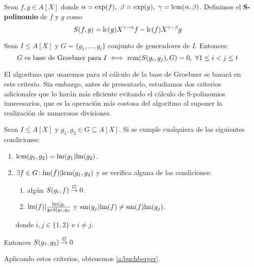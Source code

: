 \begin{definicion}
    Sean $f,g \in A[X]$ donde $\alpha=\exp(f),\ \beta=\exp(g),\ \gamma = \text{lcm}(\alpha,\beta)$. Definimos el \textbf{S-polinomio} de $f$ y $g$ como
    \begin{equation*}
        S(f,g) = \text{lc}(g)X^{\gamma-\alpha}f - \text{lc}(f)X^{\gamma-\beta}g
    \end{equation*}
\end{definicion}

\begin{teorema}\label{t:criterio}
    Sean $I\le A[X]$ y $G=\{g_1,\dots, g_t\}$ conjunto de generadores de $I$. Entonces:
    \begin{equation*}
        G \text{ es base de Groebner para } I \iff \text{rem}(S(g_i,g_j), G)=0,\ \forall 1\le i<j\le t
    \end{equation*}
\end{teorema}

El algoritmo que usaremos para el cálculo de la base de Groebner se basará en este criterio. Sin embargo, antes de presentarlo, estudiamos dos criterios adicionales que lo harán más eficiente evitando el cálculo de S-polinomios innecesarios, que es la operación más costosa del algoritmo al suponer la realización de numerosas divisiones.

\begin{teorema}\label{t:criterios}
    Sean $I\le A[X]$ y $g_1,g_2 \in G\subseteq A[X]$. Si se cumple cualquiera de las siguientes condiciones:
    \begin{enumerate}
        \item $\text{lcm}(g_1,g_2) = \text{lm}(g_1)\text{lm}(g_2)$.
        \item $\exists f\in G \colon \text{lm}(f) \vert \text{lcm}(g_1,g_2)$ y se verifica alguna de las condiciones:
        \begin{enumerate}
            \item algún $S(g_i,f)\stackrel{G}{\to} 0$.
            \item $\text{lm}(f)\vert \frac{\text{lm}(g_i}{\text{gcd}(g_1,g_2}$ y $\text{sm}(g_j)\text{lm}(f) \neq \text{sm}(f)\text{lm}(g_j)$.
        \end{enumerate}
        donde $i,j\in\{1,2\}$ e $i\neq j$.
    \end{enumerate}
    Entonces $S(g_1,g_2)\stackrel{G}{\to} 0$
\end{teorema}

 Aplicando estos criterios, obtenemos \autoref{a:buchberger}.
 
